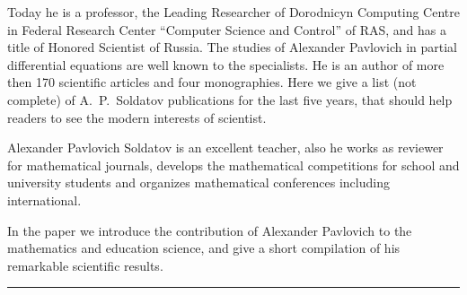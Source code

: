 Today he is a professor, the Leading Researcher of Dorodnicyn Computing Centre  in Federal Research Center ``Computer Science and Control'' of RAS, and has a title of Honored Scientist of Russia. 
The studies of  Alexander Pavlovich in partial differential equations are well known to the specialists. 
He is an author of more then 170 scientific articles and four monographies. 
Here we give a list (not complete) of A.~P.~Soldatov publications for the last five years, that should help readers to see the modern interests of scientist.

Alexander Pavlovich Soldatov is an excellent teacher, also he works as reviewer for mathematical journals, develops the mathematical competitions for school and university students and organizes mathematical conferences including international.

In the paper we introduce the contribution of Alexander Pavlovich to the mathematics and education science, and give a short compilation of his remarkable scientific results.

\bigskip

\par\noindent
\theonlineengdate \par\noindent
\rule{125mm}{.7pt}\\






\newpage

%
%
